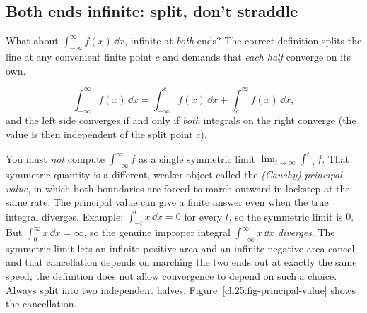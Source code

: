 \subsection{Both ends infinite: split, don't straddle}
\label{ch25:both-ends}

What about $\int_{-\infty}^{\infty} f(x)\,\dd x$, infinite at \emph{both} ends? The
correct definition splits the line at any convenient finite point $c$ and demands
that \emph{each half} converge on its own.

\begin{definition}
\label{ch25:def-doubly}
\[
  \int_{-\infty}^{\infty} f(x)\,\dd x
  = \int_{-\infty}^{c} f(x)\,\dd x + \int_{c}^{\infty} f(x)\,\dd x,
\]
and the left side converges if and only if \emph{both} integrals on the right
converge (the value is then independent of the split point $c$).
\end{definition}

\begin{trapbox}
You must \emph{not} compute $\int_{-\infty}^{\infty} f$ as a single symmetric limit
$\lim_{t\to\infty}\int_{-t}^{t} f$. That symmetric quantity is a different,
weaker object called the \emph{(Cauchy) principal value}, in which both boundaries
are forced to march outward in lockstep at the same rate.
The principal value can give a finite answer even when the true integral
diverges. Example: $\int_{-t}^{t} x\,\dd x = 0$ for every $t$, so the symmetric
limit is $0$. But $\int_0^\infty x\,\dd x = \infty$, so the genuine improper
integral $\int_{-\infty}^{\infty} x\,\dd x$ \emph{diverges}. The symmetric limit
lets an infinite positive area and an infinite negative area cancel, and that
cancellation depends on marching the two ends out at exactly the same speed; the
definition does not allow convergence to depend on such a choice. Always split into two independent halves.
Figure~\ref{ch25:fig-principal-value} shows the cancellation.
\end{trapbox}

